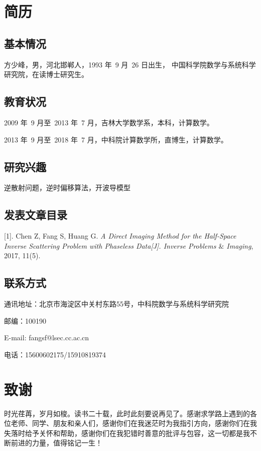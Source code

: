\chapter{简历}

\section*{基本情况}

方少峰，男，河北邯郸人，1993 年~9 月~26 日出生，
中国科学院数学与系统科学研究院，在读博士研究生。

\section*{教育状况}

2009 年~9 月至~2013 年~7 月，吉林大学数学系，本科，计算数学。

2013 年~9 月至~2018 年~7 月，中科院计算数学所，直博生，计算数学。

\section*{研究兴趣}

逆散射问题，逆时偏移算法，开波导模型
\section*{发表文章目录}

[1]. Chen Z, Fang S, Huang G. {\it A Direct Imaging Method for the Half-Space Inverse Scattering Problem with Phaseless Data[J]. Inverse Problems $\&$ Imaging}, 2017, 11(5).

\section*{联系方式}

通讯地址：北京市海淀区中关村东路55号，中科院数学与系统科学研究院

邮编：100190

E-mail: fangsf@lsec.cc.ac.cn

电话：15600602175/15910819374

\chapter{致\quad 谢}

时光荏苒，岁月如梭。读书二十载，此时此刻要说再见了。感谢求学路上遇到的各位老师、同学、朋友和亲人们，感谢你们在我迷茫时为我指引方向，感谢你们在我失落时给予关怀和帮助，感谢你们在我犯错时善意的批评与包容，这一切都是我不断前进的力量，值得铭记一生！

